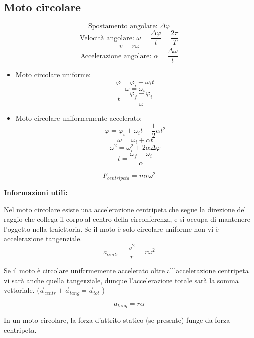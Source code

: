 \documentclass[a4paper]{article}
\theoremstyle{break}
\theoremstyle{break}
\theoremstyle{break}
\theoremstyle{break}
\begin{document}
\subsection{Moto circolare}
\[
  \text{Spostamento angolare: } \Delta \varphi
\] 
\[
  \text{Velocità angolare: } \omega = \frac{\Delta \varphi}{t} = \frac{2 \pi}{T}
\]
\[
v = r \omega
\] 
\[
  \text{Accelerazione angolare: } \alpha = \frac{\Delta \omega}{t}
\] 
\begin{itemize}
  \item Moto circolare uniforme: 
    \[
      \varphi = \varphi_i + \omega_i t
    \] 
    \[
      \omega = \omega_i
    \]
    \[
      t = \frac{\varphi_f - \varphi_i}{\omega}
    \]
  \item Moto circolare uniformemente accelerato:
    \[
      \varphi = \varphi_i + \omega_i t + \frac{1}{2} \alpha t^2
    \]
    \[
      \omega = \omega_i + \alpha t
    \]
    \[
      \omega^2 = \omega_i^2 + 2 \alpha \Delta \varphi
    \]
    \[
      t = \frac{\omega_f - \omega_i}{\alpha}
    \]
\end{itemize}
\vspace{1em}
\[
  F_{centripeta} = m r \omega^2
\] 

\noindent \textbf{Informazioni utili:}

\noindent Nel moto circolare esiste una accelerazione centripeta che segue la direzione 
del raggio che collega il corpo al centro della circonferenza, e si occupa di mantenere 
l’oggetto nella traiettoria. Se il moto è solo circolare uniforme non vi è accelerazione 
tangenziale. 
\[
  a_{centr} = \frac{v^2}{r} = r \omega^2
\] 

\vspace{1em}
\noindent Se il moto è circolare uniformemente accelerato oltre all’accelerazione 
centripeta vi sarà anche quella tangenziale, dunque l’accelerazione totale sarà la somma
vettoriale. (\( \vec{a}_{centr} + \vec{a}_{tang} = \vec{a}_{tot} \) ) 

\[
  a_{tang} = r \alpha
\]  

\vspace{1em}
\noindent In un moto circolare, la forza d’attrito statico (se presente) funge 
da forza centripeta.
\end{document}
